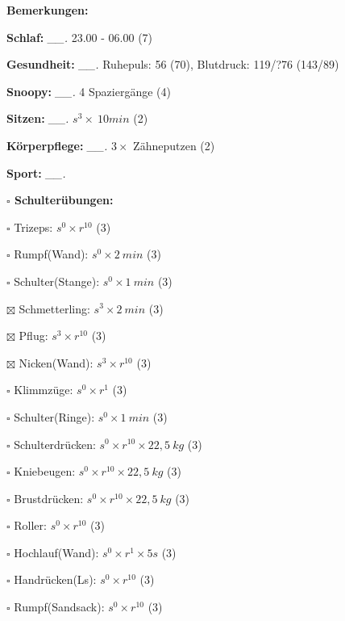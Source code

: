 \documentclass[10pt,a4paper]{article}
\newcommand\prop[1] {{\color {alizarin} {\bf #1}}}             %
\newcommand\mand[1] {{\color {burntorange} {\bf #1}}}          %
\newcommand\topspace{\vskip -15pt \hskip 20pt}
\newcommand\n[1] { {\sl #1.} \hskip 5pt }
\begin{document}
\begin{mdframed}[style=daystyle]
  \begin{labeling}{{\mand {Bemerkungen:}}}
    \setlength\itemsep{-3pt}
  \item[{\mand {Schlaf:}}]        \n{\_\_} 23.00 - 06.00 (7)
  \item[{\mand {Gesundheit:}}]    \n{\_\_} Ruhepuls: 56 (70), Blutdruck: 119/?76 (143/89)
  \item[{\mand {Snoopy:}}]        \n{\_\_} 4 Spaziergänge (4)  
  \item[{\mand {Sitzen:}}]        \n{\_\_} $s^3 \times\ 10 min$ (2)
  \item[{\mand {Körperpflege:}}]  \n{\_\_} $3 \times$ Zähneputzen (2)
  \item[{\mand {Sport:}}]         \n{\_\_}
    \topspace
    \begin{minipage}{0.75\textwidth}  
      \begin{labeling}{\prop {$\square$ {Schulterübungen:}}} 
        \setlength\itemsep{-3pt}
      \item[$\square$ Trizeps:]          $s^0 \times r^{10}$ (3)
      \item[$\square$ Rumpf(Wand):]      $s^0 \times 2\ min$ (3)
      \item[$\square$ Schulter(Stange):] $s^0 \times 1\ min$ (3)
      \item[$\boxtimes$ Schmetterling:]    $s^3 \times 2\ min$ (3)
      \item[$\boxtimes$ Pflug:]            $s^3 \times r^{10}$ (3)
      \item[$\boxtimes$ Nicken(Wand):]     $s^3 \times r^{10}$ (3)
      \item[$\square$ Klimmzüge:]        $s^0 \times r^1$ (3)
      \item[$\square$ Schulter(Ringe):]  $s^0 \times 1\ min$ (3)
      \item[$\square$ Schulterdrücken:]  $s^0 \times r^{10} \times 22,5\ kg$ (3)
      \item[$\square$ Kniebeugen:]       $s^0 \times r^{10} \times 22,5\ kg$ (3)
      \item[$\square$ Brustdrücken:]     $s^0 \times r^{10} \times 22,5\ kg$ (3)
      \item[$\square$ Roller:]           $s^0 \times r^{10}$ (3)
      \item[$\square$ Hochlauf(Wand):]   $s^0 \times r^{1} \times 5s$ (3)
      \item[$\square$ Handrücken(Ls):]   $s^0 \times r^{10}$ (3)
      \item[$\square$ Rumpf(Sandsack):]  $s^0 \times r^{10}$ (3)

\end{labeling}
\end{minipage}
\end{labeling}
\end{mdframed}
\end{document}
